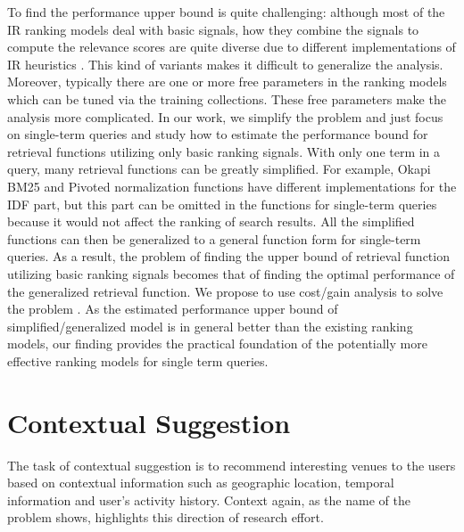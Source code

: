 To find the performance upper bound is quite challenging: although most of 
the IR ranking models deal with basic signals, how they combine the signals 
to compute the relevance scores are quite diverse due to different 
implementations of IR heuristics \cite{Fang:2004:FSI:1008992.1009004}. 
This kind of variants makes it difficult to generalize the analysis. 
Moreover, typically there are one or more free parameters in the ranking 
models which can be tuned via the training collections. 
These free parameters make the analysis more complicated.
In our work, we simplify the problem and just focus on single-term queries 
and study how to estimate the performance bound for retrieval functions 
utilizing only basic ranking signals. 
With only one term in a query, many retrieval functions can be greatly 
simplified. For example, Okapi BM25 and Pivoted normalization functions have 
different implementations for the IDF part, but this part can be omitted in the 
functions for single-term queries because it would not affect the ranking of 
search results. All the simplified functions can then be generalized to a 
general function form for single-term queries. As a result, the problem of 
finding the upper bound of retrieval function utilizing basic ranking signals 
becomes that of finding the optimal performance of the generalized retrieval 
function. We propose to use cost/gain analysis to solve the problem \cite{export:132652,export:68133,export:81144}. 
As the estimated performance upper bound of simplified/generalized model is 
in general better than the existing ranking models, our finding provides the 
practical foundation of the potentially more effective ranking models for 
single term queries.

\section{Contextual Suggestion}
The task of contextual suggestion is to recommend interesting venues to the 
users based on contextual information such as geographic location, 
temporal information and user's activity history. 
Context again, as the name of the problem shows, highlights this direction 
of research effort. 

